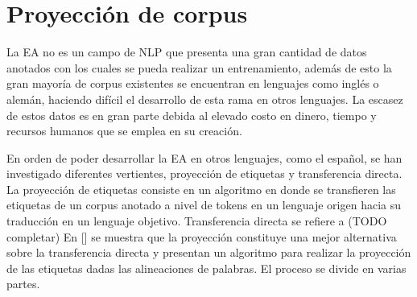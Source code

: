 
\section{Proyección de corpus}

La EA no es un campo de NLP que presenta una gran cantidad de datos anotados con los cuales se pueda realizar 
un entrenamiento, además de esto la gran mayoría de corpus existentes se encuentran en lenguajes como inglés o alemán,
haciendo difícil el desarrollo de esta rama en otros lenguajes.
La escasez de estos datos es en gran parte debida al elevado costo en dinero, tiempo y recursos humanos que se emplea
en su creación.

En orden de poder desarrollar la EA en otros lenguajes, como el español, se han investigado diferentes vertientes, 
proyección de etiquetas y transferencia directa. La proyección de etiquetas consiste en un algoritmo en donde se 
transfieren las etiquetas de un corpus anotado a nivel de tokens en un lenguaje origen hacia su traducción en un 
lenguaje objetivo. Transferencia directa se refiere a (TODO completar)
En [\cite{eger2018cross}] se muestra que la proyección constituye una mejor alternativa sobre la transferencia
directa y presentan un algoritmo para realizar la proyección de las etiquetas dadas las alineaciones de palabras.
El proceso se divide en varias partes.

